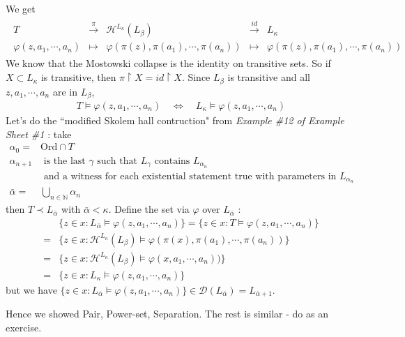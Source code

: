 \documentclass[12pt,a4paper]{article}
\newenvironment{proof}
{\begin{changemargin}{0.5cm}{0.5cm} 
	}%
	{\end{changemargin}
}
\newenvironment{p}
{\begin{proof} 
	}%
	{\end{proof}
}
\begin{document}
\begin{p}
We get
\begin{align*}
\begin{array}{ccccc}
T & \xrightarrow{\pi} & \mathcal{H}^{L_{\kappa}}(L_{\beta}) & \xrightarrow{id} & L_{\kappa} \\
\varphi(z, a_1, \cdots, a_n) & \mapsto & \varphi(\pi(z), \pi(a_1), \cdots, \pi(a_n)) & \mapsto & \varphi(\pi(z), \pi(a_1), \cdots, \pi(a_n))
\end{array}
\end{align*}
We know that the Mostowski collapse is the identity on transitive sets. So if $X\subset L_{\kappa}$ is transitive, then $\pi \upharpoonright X = id \upharpoonright X$. Since $L_{\beta}$ is transitive and all $z, a_1, \cdots, a_n$ are in $L_{\beta}$,
\begin{align*}
T\models \varphi(z, a_1, \cdots, a_n) \quad \Leftrightarrow \quad L_{\kappa} \models \varphi(z, a_1, \cdots, a_n)
\end{align*}
Let's do the ``modified Skolem hall contruction" from \emph{Example \#12 of Example Sheet \#1} : take
\begin{align*}
\alpha_0 =& \text{Ord} \cap T\\
\alpha_{n+1} &\text{ is the last } \gamma \text{ such that } L_{\gamma} \text{ contains } L_{\alpha_n} \\
&\text{ and a witness for each existential statement true with parameters in } L_{\alpha_n} \\
\bar{\alpha} =& \bigcup_{n\in \mathbb{N}}\alpha_n
\end{align*} 
then $T\prec L_{\bar{\alpha}}$ with $\bar{\alpha} < \kappa$. Define the set via $\varphi$ over $L_{\bar{\alpha}}$ :
\begin{align*}
& \{z\in x: L_{\bar{\alpha}} \models \varphi(z, a_1, \cdots, a_n) \} = \{z\in x : T\models \varphi(z, a_1, \cdots, a_n) \} \\
=& \Big\{ z\in x : \mathcal{H}^{L_{\kappa}} (L_{\beta}) \models \varphi(\pi(x), \pi(a_1), \cdots, \pi(a_n)) \Big\} \\
=& \{ z\in x : \mathcal{H}^{L_{\kappa}}(L_{\beta}) \models \varphi(x, a_1, \cdots, a_n))\} \\
=& \{z\in x: L_{\kappa} \models \varphi(z, a_1, \cdots, a_n) \} 
\end{align*}
but we have $\{z\in x: L_{\bar{\alpha}} \models \varphi(z, a_1, \cdots, a_n) \} \in \mathscr{D}(L_{\bar{\alpha}}) = L_{\bar{\alpha}+1}$.

\quad Hence we showed Pair, Power-set, Separation. The rest is similar - do as an exercise.

\eop
\end{p}
\s
\end{document}
